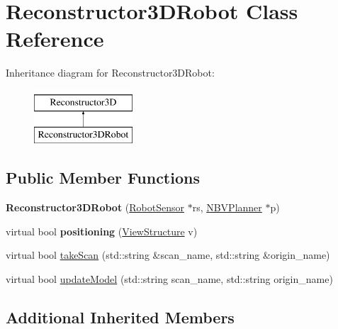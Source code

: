 \hypertarget{classReconstructor3DRobot}{}\section{Reconstructor3\+D\+Robot Class Reference}
\label{classReconstructor3DRobot}
Inheritance diagram for Reconstructor3\+D\+Robot\+:\begin{figure}[H]
\begin{center}
\leavevmode
\includegraphics[height=2.000000cm]{classReconstructor3DRobot}
\end{center}
\end{figure}
\subsection*{Public Member Functions}
\begin{DoxyCompactItemize}
\item 
{\bfseries Reconstructor3\+D\+Robot} (\hyperlink{classRobotSensor}{Robot\+Sensor} $\ast$rs, \hyperlink{classNBVPlanner}{N\+B\+V\+Planner} $\ast$p)\hypertarget{classReconstructor3DRobot_ab55aad2f90ffbb721ea928966097599b}{}\label{classReconstructor3DRobot_ab55aad2f90ffbb721ea928966097599b}

\item 
virtual bool {\bfseries positioning} (\hyperlink{classViewStructure}{View\+Structure} v)\hypertarget{classReconstructor3DRobot_ade439094908d055af59c03d604649f02}{}\label{classReconstructor3DRobot_ade439094908d055af59c03d604649f02}

\item 
virtual bool \hyperlink{classReconstructor3DRobot_aa30cad4bf09b5d58cac1e9b751e7842b}{take\+Scan} (std\+::string \&scan\+\_\+name, std\+::string \&origin\+\_\+name)
\item 
virtual bool \hyperlink{classReconstructor3DRobot_abd43d6ee1bb11d843db1d39b7498b1fc}{update\+Model} (std\+::string scan\+\_\+name, std\+::string origin\+\_\+name)
\end{DoxyCompactItemize}
\subsection*{Additional Inherited Members}


